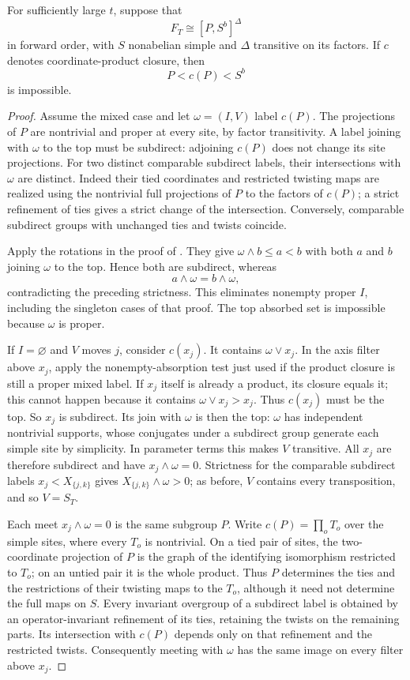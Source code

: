 \begin{lemma}\label{r:marker-mixed}
For sufficiently large $t$, suppose that
\[
 F_T\cong[P,S^b]^\Delta
\]
in forward order, with $S$ nonabelian simple and $\Delta$
transitive on its factors.  If $c$ denotes coordinate-product
closure, then
\[
 P<c(P)<S^b
\]
is impossible.
\end{lemma}

\begin{proof}
Assume the mixed case and let $\omega=(I,V)$ label $c(P)$.
The projections of $P$ are nontrivial and proper at every site,
by factor transitivity.  A label joining with $\omega$ to the top
must be subdirect: adjoining $c(P)$ does not change its site
projections.  For two distinct comparable subdirect labels, their
intersections with $\omega$ are distinct.  Indeed their tied
coordinates and restricted twisting maps are realized using the
nontrivial full projections of $P$ to the factors of $c(P)$;
a strict refinement of ties gives a strict change of the
intersection.  Conversely, comparable subdirect groups with
unchanged ties and twists coincide.

Apply the rotations in the proof of .
They give $\omega\wedge b\le a<b$ with both $a$ and $b$ joining
$\omega$ to the top.  Hence both are subdirect, whereas
\[
 a\wedge\omega=b\wedge\omega,
\]
contradicting the preceding strictness.  This eliminates nonempty
proper $I$, including the singleton cases of that proof.
The top absorbed set is impossible because $\omega$ is proper.

If $I=\varnothing$ and $V$ moves $j$, consider $c(x_j)$.
It contains $\omega\vee x_j$.  In the axis filter above $x_j$,
apply the nonempty-absorption test just used if the product
closure is still a proper mixed label.  If $x_j$ itself is already
a product, its closure equals it; this cannot happen because it
contains $\omega\vee x_j>x_j$.  Thus $c(x_j)$ must be the top.
So $x_j$ is subdirect.  Its join with $\omega$ is then the top:
$\omega$ has independent nontrivial supports, whose conjugates
under a subdirect group generate each simple site by simplicity.
In parameter terms this makes $V$ transitive.  All $x_j$ are
therefore subdirect and have $x_j\wedge\omega=0$.
Strictness for the comparable subdirect labels
$x_j<X_{\{j,k\}}$ gives
$X_{\{j,k\}}\wedge\omega>0$; as before, $V$ contains every
transposition, and so $V=S_T$.

Each meet $x_j\wedge\omega=0$ is the same subgroup $P$.
Write $c(P)=\prod_o T_o$ over the simple sites, where every $T_o$ is
nontrivial.  On a tied pair of sites, the two-coordinate projection
of $P$ is the graph of the identifying isomorphism restricted to
$T_o$; on an untied pair it is the whole product.  Thus $P$ determines
the ties and the restrictions of their twisting maps to the $T_o$,
although it need not determine the full maps on $S$.  Every invariant
overgroup of a subdirect label is obtained by an operator-invariant
refinement of its ties, retaining the twists on the remaining parts.
Its intersection with $c(P)$ depends only on that refinement and the
restricted twists.  Consequently meeting with $\omega$ has the same
image on every filter above $x_j$.


\end{proof}
